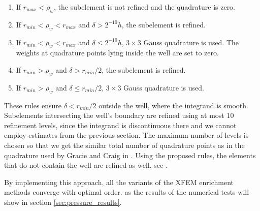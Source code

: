 
\begin{enumerate}
 \item If $r_{max} < \rho_w$, the subelement is not refined and the quadrature is zero.
 \item If $r_{min} < \rho_w < r_{max}$ and $\delta > 2^{-10}h$, the subelement is refined.
 \item If $r_{min} < \rho_w < r_{max}$ and $\delta \le 2^{-10}h$, $3\times3$ Gauss quadrature is used.
 The weights at quadrature points lying inside the well are set to zero.
 \item If $r_{min} > \rho_w$ and $\delta > r_{min} / 2$, the subelement is refined.
 \item If $r_{min} > \rho_w$ and $\delta \le r_{min} / 2$, $3\times3$ Gauss quadrature is used.
\end{enumerate}


These rules ensure $\delta < r_{min}/2$ outside the well, where the integrand is smooth. Subelements intersecting 
the well's boundary are refined using at most $10$ refinement levels, since the integrand is discontinuous there and we cannot employ 
estimates from the previous section. The maximum number of levels is chosen so that we get the similar total number of quadrature points 
as in the quadrature used by Gracie and Craig in \cite{gracie_modelling_2010}. Using the proposed rules, the elements that do not contain the well are refined as well,
see . 

By implementing this approach, all the variants of the XFEM enrichment methods converge with optimal order.
as the results of the numerical tests will show in section \ref{sec:pressure_results}.

